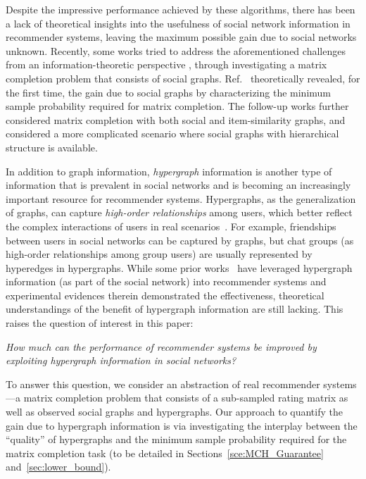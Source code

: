 \documentclass{article}
\begin{document}
Despite the impressive performance achieved by these algorithms, there has been a lack of theoretical insights into the usefulness of social network information in recommender systems, leaving the maximum possible gain due to social networks unknown. Recently, some works tried to address the aforementioned challenges from an information-theoretic perspective \citep{ahn2018binary, jo2021discrete, zhang2021community, zhang2022mc2g, elmahdy2020matrix, elmahdy2022optimal, suh2021use}, through investigating a matrix completion problem that consists of social graphs.
Ref.~\cite{ahn2018binary} theoretically revealed, for the first time, the gain due to social graphs by characterizing the minimum sample probability required for matrix completion. The follow-up works \citep{zhang2021community,zhang2022mc2g} further considered matrix completion with both social and item-similarity graphs, and \cite{elmahdy2020matrix} considered a more complicated scenario where social graphs with hierarchical structure is available. 

In addition to graph information, \emph{hypergraph} information is another type of information that is prevalent in social networks and is becoming an increasingly important resource for recommender systems. Hypergraphs, as the generalization of graphs, can capture  \emph{high-order relationships} among users, which better reflect the complex interactions of users in real scenarios~\citep{de2020social}. For example, friendships between users in social networks can be captured by graphs, but chat groups (as high-order relationships among group users) are usually represented by hyperedges in hypergraphs. While some prior works~\citep{zheng2018novel, li2013link, zhao2018learning} have leveraged hypergraph information (as part of the social network) into recommender systems and experimental evidences therein demonstrated the effectiveness, theoretical understandings of the benefit of hypergraph information are still lacking. This raises the question of interest in this paper:

\begin{center}
\emph{How much can the performance of recommender systems be improved by \\exploiting hypergraph information in social networks?}
\end{center}

To answer this question, we consider an abstraction of real recommender systems---a matrix completion problem that consists of a sub-sampled rating matrix as well as observed social graphs and hypergraphs. Our approach to quantify the gain due to hypergraph information is via investigating the interplay between  the ``quality'' of hypergraphs and the minimum sample probability required for the matrix completion task (to be detailed in Sections~\ref{sce:MCH_Guarantee} and~\ref{sec:lower_bound}).
\end{document}
